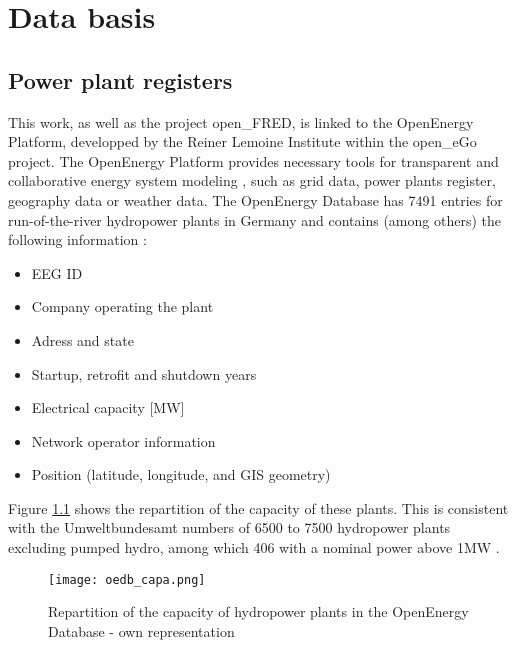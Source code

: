 \chapter{Data basis}
\label{chap:data_basis}

\section{Power plant registers}
\label{hpp_register}




This work, as well as the project open\_FRED, is linked to the OpenEnergy Platform, developped by the Reiner Lemoine Institute within the open\_eGo project. The OpenEnergy Platform provides necessary tools for transparent and collaborative energy system modeling \cite{oedb}, such as grid data, power plants register, geography data or weather data. The OpenEnergy Database has 7491 entries for run-of-the-river hydropower plants in Germany and contains (among others) the following information :
\begin{itemize}
\itemsep0em 
 \item EEG ID
 \item Company operating the plant
 \item Adress and state
 \item Startup, retrofit and shutdown years
 \item Electrical capacity [MW]
 \item Network operator information
 \item Position (latitude, longitude, and GIS geometry)
\end{itemize}


Figure \ref{oedb_capa} shows the repartition of the capacity of these plants. This is consistent with the Umweltbundesamt numbers of 6500 to 7500 hydropower plants excluding pumped hydro, among which 406 with a nominal power above 1MW \cite{uba_wasserkraft}. 

\begin{figure}[H]
\texttt{[image: oedb\_capa.png]}
\caption[Repartition of the capacity of hydropower plants in the OpenEnergy Database]{Repartition of the capacity of hydropower plants in the OpenEnergy Database - own representation}
\centering
\label{oedb_capa}
\end{figure}


